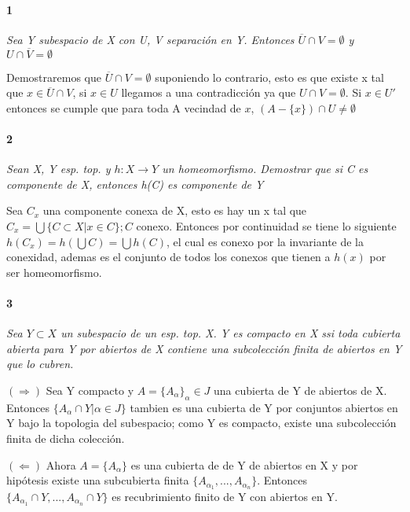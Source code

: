 \documentclass[12pt]{article}
\author{Alumnos: \\Arturo Rodriguez Contreras - 2132880 \\
Jonathan Raymundo Torres Cardenas - 1949731\\
Praxedis Jimenes Ruvalcaba \\
Erick Román Montemayor Treviño - 1957959 \\
Alexis Noe Mora Leyva \\
Everardo Flores Rivera - 2127301}
\begin{document}
\maketitle

\paragraph{1}
\textit{Sea Y subespacio de X con U, V separación en Y. Entonces $\overline{U}\cap V=\emptyset$ y $U\cap\overline{V}=\emptyset$}

Demostraremos que $\overline{U}\cap V=\emptyset$ suponiendo lo contrario, esto es que existe x tal que $x\in\overline U \cap V$, si $x\in U $ llegamos a una contradicción ya que $U\cap V=\emptyset$. Si $x\in U'$ entonces se cumple que para toda A vecindad de $x$, $(A-\{x\})\cap U\neq\emptyset$

\paragraph{2}
\textit{Sean X, Y esp. top. y $h:X\rightarrow Y$ un homeomorfismo. Demostrar que si C es componente de X, entonces h(C) es componente de Y}

Sea $C_x$ una componente conexa de X, esto es hay un x tal que $C_x=\bigcup\{C\subset X|x\in C\};C$ conexo. Entonces  por continuidad se tiene lo siguiente $h(C_x)=h(\bigcup C)=\bigcup h(C)$, el cual es conexo por la invariante de la conexidad, ademas es el conjunto de todos los conexos que tienen a $h(x)$ por ser homeomorfismo.
\paragraph{3}
\textit{Sea $Y\subset X$ un subespacio de un esp. top. X. Y es compacto en X ssi toda cubierta abierta para Y por abiertos de X contiene una subcolección finita de abiertos en Y que lo cubren.}

$(\Rightarrow)$ Sea Y compacto y $A=\{A_\alpha\}_\alpha\in J$ una cubierta de Y de abiertos de X. Entonces $\{A_\alpha\cap Y|\alpha\in J\}$ tambien es una cubierta de Y por conjuntos abiertos en Y bajo la topologia del subespacio; como Y es compacto, existe una subcolección finita de dicha colección.

$(\Leftarrow)$ Ahora $A=\{A_\alpha\}$ es una cubierta de de Y de abiertos en X y por hipótesis existe una subcubierta finita $\{A_{\alpha_1},...,A_{\alpha_n}\}$. Entonces $\{A_{\alpha_1}\cap Y,...,A_{\alpha_n}\cap Y\}$ es recubrimiento finito de Y con abiertos en Y.
\end{document}
